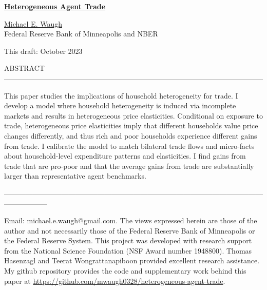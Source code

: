 \documentclass[12pt,pdftex]{article}
\begin{document}
\begin{onehalfspacing}

{\large \textbf{\href{https://www.waugheconomics.com/uploads/2/2/5/6/22563786/heterogeneous-agent-trade.pdf}{Heterogeneous Agent Trade}}}

\vspace{0.5cm}

\href{http://www.waugheconomics.com/}{Michael E. Waugh} \\ Federal Reserve Bank of Minneapolis and NBER

\vspace{0.5cm}

This draft: October 2023

\vspace{1.5cm}


\normalsize

ABSTRACT ------------------------------------------------------------------------------------------------------------

This paper studies the implications of household heterogeneity for trade. I develop a model where household heterogeneity is induced via incomplete markets and results in heterogeneous price elasticities. Conditional on exposure to trade, heterogeneous price elasticities imply that different households value price changes differently, and thus rich and poor households experience different gains from trade. I calibrate the model to match bilateral trade flows and micro-facts about household-level expenditure patterns and elasticities. I find gains from trade that are pro-poor and that the average gains from trade are substantially larger than representative agent benchmarks.

------------------------------------------------------------------------------------------------------------------------------
%

\vspace{7.25cm}

\footnotesize Email: michael.e.waugh@gmail.com. The views expressed herein are those of the author and not necessarily those of the Federal Reserve Bank of Minneapolis or the Federal Reserve System. This project was developed with research support from the National Science Foundation (NSF Award number 1948800). Thomas Hasenzagl and
Teerat Wongrattanapiboon provided excellent research assistance. My github repository provides the code and supplementary work behind this paper at \url{https://github.com/mwaugh0328/heterogeneous-agent-trade}.


\end{onehalfspacing}
\end{document}
